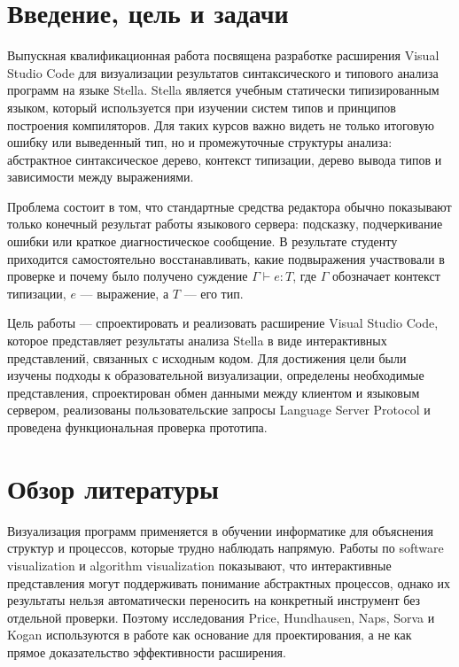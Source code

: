 ﻿\documentclass[14pt,a4paper]{extarticle}
\begin{document}


\setcounter{page}{2}

\section*{Введение, цель и задачи}

Выпускная квалификационная работа посвящена разработке расширения Visual Studio Code для визуализации результатов синтаксического и типового анализа программ на языке Stella. Stella является учебным статически типизированным языком, который используется при изучении систем типов и принципов построения компиляторов. Для таких курсов важно видеть не только итоговую ошибку или выведенный тип, но и промежуточные структуры анализа: абстрактное синтаксическое дерево, контекст типизации, дерево вывода типов и зависимости между выражениями.

Проблема состоит в том, что стандартные средства редактора обычно показывают только конечный результат работы языкового сервера: подсказку, подчеркивание ошибки или краткое диагностическое сообщение. В результате студенту приходится самостоятельно восстанавливать, какие подвыражения участвовали в проверке и почему было получено суждение $\Gamma \vdash e : T$, где $\Gamma$ обозначает контекст типизации, $e$ --- выражение, а $T$ --- его тип.

Цель работы --- спроектировать и реализовать расширение Visual Studio Code, которое представляет результаты анализа Stella в виде интерактивных представлений, связанных с исходным кодом. Для достижения цели были изучены подходы к образовательной визуализации, определены необходимые представления, спроектирован обмен данными между клиентом и языковым сервером, реализованы пользовательские запросы Language Server Protocol и проведена функциональная проверка прототипа.

\section*{Обзор литературы}

Визуализация программ применяется в обучении информатике для объяснения структур и процессов, которые трудно наблюдать напрямую. Работы по software visualization и algorithm visualization показывают, что интерактивные представления могут поддерживать понимание абстрактных процессов, однако их результаты нельзя автоматически переносить на конкретный инструмент без отдельной проверки. Поэтому исследования Price, Hundhausen, Naps, Sorva и Kogan используются в работе как основание для проектирования, а не как прямое доказательство эффективности расширения.
\end{document}
